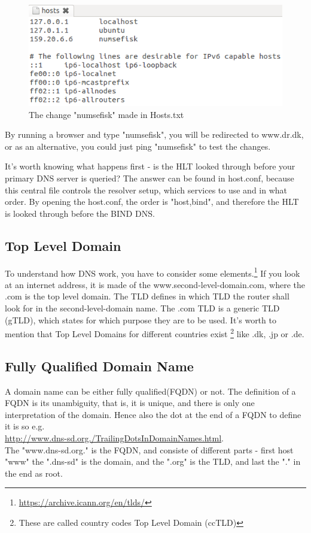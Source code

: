 \begin{figure}[ht!]
\centering
\includegraphics[width=150mm]{img/hostsText.png}
\caption{The change "numsefisk" made in Hosts.txt}
\label{hostsText}
\end{figure}

By running a browser and type "numsefisk", you will be redirected to www.dr.dk, or as an alternative, you could just ping "numsefisk" to test the changes.

It's worth knowing what happens first - is the HLT looked through before your primary DNS server is queried?
The answer can be found in host.conf, because this central file controls the resolver setup, which services to use and in what order. By opening the host.conf, the order is "host,bind", and therefore the HLT is looked through before the BIND DNS.


\subsection{Top Level Domain}
To understand how DNS work, you have to consider some elements.\footnote{\url{https://archive.icann.org/en/tlds/}} If you look at an internet address, it is made of the www.second-level-domain.com, where the .com is the top level domain. The TLD defines in which TLD the router shall look for in the second-level-domain name.
The .com TLD is a generic TLD (gTLD), which states for which purpose they are to be used. It's worth to mention that Top Level Domains for different countries exist \footnote{These are called country codes Top Level Domain (ccTLD)} like .dk, .jp or .de.

\subsection{Fully Qualified Domain Name}
A domain name can be either fully qualified(FQDN) or not. The definition of a FQDN is its unambiguity, that is, it is unique, and there is only one interpretation of the domain. Hence also the dot at the end of a FQDN to define it is so e.g. \\ \url{http://www.dns-sd.org./TrailingDotsInDomainNames.html}. \\
The "www.dns-sd.org." is the FQDN, and consiste of different parts - first host "www" the ".dns-sd" is the domain, and the ".org" is the TLD, and last the "." in the end as root.

